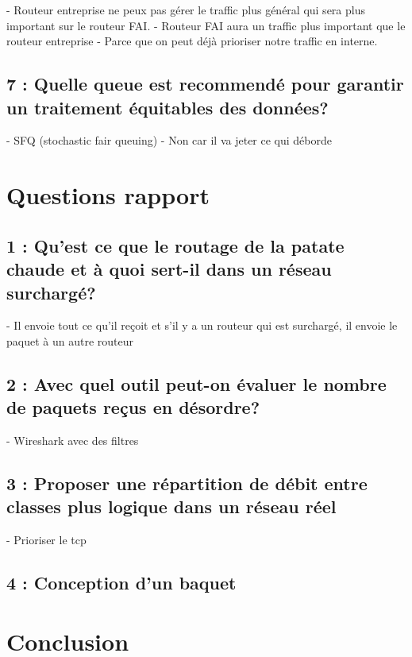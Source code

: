 \documentclass{article}
\begin{document}
- Routeur entreprise ne peux pas gérer le traffic plus général qui sera plus important sur le routeur FAI.
- Routeur FAI aura un traffic plus important que le routeur entreprise
- Parce que on peut déjà prioriser notre traffic en interne.

\subsection*{7 : Quelle queue est recommendé pour garantir un traitement équitables des données?}

- SFQ (stochastic fair queuing)
- Non car il va jeter ce qui déborde

\section{Questions rapport}

\subsection*{1 : Qu'est ce que le routage de la patate chaude et à quoi sert-il dans un réseau surchargé?}

- Il envoie tout ce qu'il reçoit et s'il y a un routeur qui est surchargé, il envoie le paquet à un autre routeur

\subsection{2 : Avec quel outil peut-on évaluer le nombre de paquets reçus en désordre?}

- Wireshark avec des filtres

\subsection*{3 : Proposer une répartition de débit entre classes plus logique dans un réseau réel}

- Prioriser le tcp

\subsection*{4 : Conception d'un baquet}




\section{Conclusion}

\printbibliography
\end{document}
